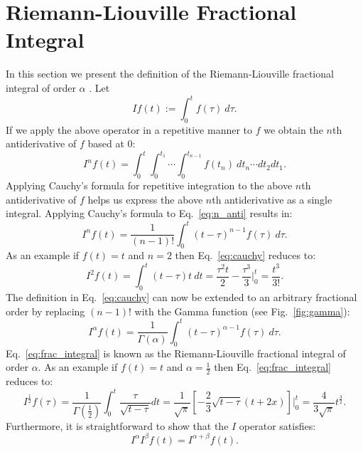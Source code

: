 \documentclass{article}
\theoremstyle{theorem}
\theoremstyle{definition}
\begin{document}
\section{Riemann-Liouville Fractional Integral}
In this section we present the definition of the Riemann-Liouville fractional integral of order $\alpha$ \cite{laurent1884}. Let
\begin{equation}
If(t) := \int_0^t f(\tau)~d\tau.
\end{equation}
If we apply the above operator in a repetitive manner to $f$ we obtain the $n$th antiderivative of $f$ based at 0:
\begin{equation}
\label{eq:n_anti}
I^nf(t) = \int_0^t\int_0^{t_1}\cdots \int_0^{t_{n-1}}f(t_n)~dt_n\cdots dt_2 dt_1.
\end{equation}
Applying Cauchy's formula for repetitive integration to the above $n$th antiderivative of $f$ helps us express the above $n$th antiderivative as a single integral. 
Applying Cauchy's formula to Eq.~\eqref{eq:n_anti} results in:
\begin{equation}
\label{eq:cauchy}
I^nf(t) = \frac{1}{(n-1)!}\int_0^t (t-\tau)^{n-1}f(\tau)~d\tau.
\end{equation}
As an example if $f(t)=t$ and $n=2$ then Eq.~\eqref{eq:cauchy} reduces to:
\begin{equation}
I^2f(t) = \int_0^t (t-\tau)t~dt = \frac{\tau^2 t}{2} - \frac{\tau^3}{3} \Bigg |_0^t = \frac{t^3}{3!}.
\end{equation}
The definition in Eq.~\eqref{eq:cauchy} can now be extended to an arbitrary fractional order by replacing $(n-1)!$ with the Gamma function (see Fig.~\ref{fig:gamma}):
\begin{equation}
\label{eq:frac_integral}
I^{\alpha}f(t) = \frac{1}{\Gamma(\alpha)}\int_0^t (t-\tau)^{\alpha-1}f(\tau)~d\tau.
\end{equation}
Eq.~\eqref{eq:frac_integral} is known as the Riemann-Liouville fractional integral of order $\alpha$. As an example if $f(t)=t$ and $\alpha=\frac{1}{2}$ then 
Eq.~\eqref{eq:frac_integral} reduces to:
\begin{equation}
I^{\frac{1}{2}}f(\tau) = \frac{1}{\Gamma(\frac{1}{2})} \int_0^t \frac{\tau}{\sqrt{t-\tau}} dt = \frac{1}{\sqrt{\pi}}\left [ -\frac{2}{3}\sqrt{t-\tau}(t+2x)\right] \Bigg |_0^t=\frac{4}{3\sqrt{\pi}}t^{\frac{3}{2}}. 
\end{equation}
Furthermore, it is straightforward to show that the $I$ operator satisfies:
\begin{equation}
I^{\alpha}I^{\beta}f(t) = I^{\alpha+\beta}f(t). 
\end{equation}
\end{document}
